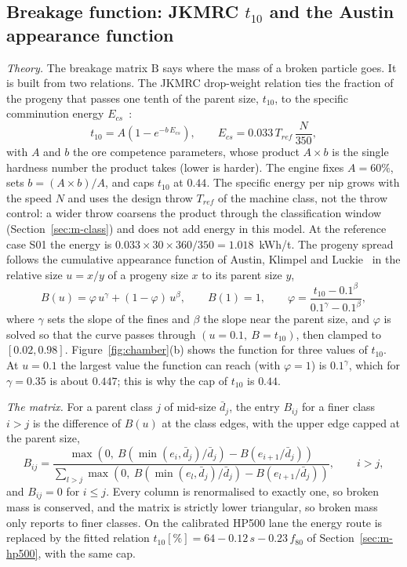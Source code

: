 \subsection{Breakage function: JKMRC \texorpdfstring{$t_{10}$}{t10} and the Austin appearance function}\label{sec:m-breakage}

\emph{Theory.} The breakage matrix $\mathrm B$ says where the mass of a broken particle goes. It is built from two relations. The
JKMRC drop-weight relation ties the fraction of the progeny that passes one tenth of the parent size, $t_{10}$, to the specific
comminution energy $E_{cs}$~\cite{napier1996}:
\begin{equation}
t_{10} = A\left(1 - e^{-b\,E_{cs}}\right),\qquad E_{cs} = 0.033\,T_{ref}\,\frac{N}{350},
\label{eq:t10}
\end{equation}
with $A$ and $b$ the ore competence parameters, whose product $A\times b$ is the single hardness number the product takes (lower is
harder). The engine fixes $A=60\%$, sets $b=(A\times b)/A$, and caps $t_{10}$ at $0.44$. The specific energy per nip grows with the
speed $N$ and uses the design throw $T_{ref}$ of the machine class, not the throw control: a wider throw coarsens the product through
the classification window (Section~\ref{sec:m-class}) and does not add energy in this model. At the reference case S01 the energy is
$0.033\times30\times360/350=1.018$~kWh/t. The progeny spread follows the cumulative appearance function of Austin, Klimpel and
Luckie~\cite{austin1984} in the relative size $u=x/y$ of a progeny size $x$ to its parent size $y$,
\begin{equation}
B(u) = \varphi\,u^{\gamma} + (1-\varphi)\,u^{\beta},\qquad B(1)=1,\qquad
\varphi = \frac{t_{10} - 0.1^{\beta}}{0.1^{\gamma} - 0.1^{\beta}},
\label{eq:austin}
\end{equation}
where $\gamma$ sets the slope of the fines and $\beta$ the slope near the parent size, and $\varphi$ is solved so that the curve
passes through $(u=0.1,\ B=t_{10})$, then clamped to $[0.02, 0.98]$. Figure~\ref{fig:chamber}(b) shows the function for three values
of $t_{10}$. At $u=0.1$ the largest value the function can reach (with $\varphi=1$) is $0.1^{\gamma}$, which for $\gamma=0.35$ is
about $0.447$; this is why the cap of $t_{10}$ is $0.44$.

\emph{The matrix.} For a parent class $j$ of mid-size $\bar d_j$, the entry $B_{ij}$ for a finer class $i>j$ is the difference of
$B(u)$ at the class edges, with the upper edge capped at the parent size,
\begin{equation}
B_{ij} = \frac{\max\!\left(0,\ B\!\left(\min(e_i,\bar d_j)/\bar d_j\right) - B\!\left(e_{i+1}/\bar d_j\right)\right)}
{\sum_{l>j}\max\!\left(0,\ B\!\left(\min(e_l,\bar d_j)/\bar d_j\right) - B\!\left(e_{l+1}/\bar d_j\right)\right)},\qquad i>j,
\label{eq:bmatrix}
\end{equation}
and $B_{ij}=0$ for $i\le j$. Every column is renormalised to exactly one, so broken mass is conserved, and the matrix is strictly
lower triangular, so broken mass only reports to finer classes. On the calibrated HP500 lane the energy route is replaced by the
fitted relation $t_{10}[\%]=64-0.12\,s-0.23\,f_{80}$ of Section~\ref{sec:m-hp500}, with the same cap.

